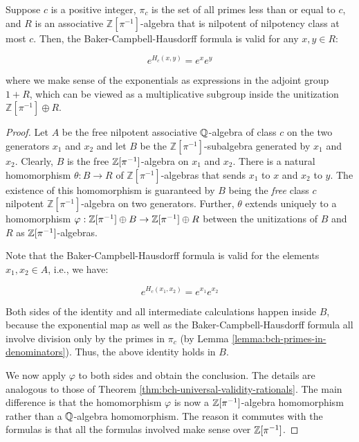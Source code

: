\begin{theorem}\label{thm:bch-universal-validity-pi-powered}
  Suppose $c$ is a positive integer, $\pi_c$ is the set of all primes
  less than or equal to $c$, and $R$ is an associative
  $\mathbb{Z}[\pi^{-1}]$-algebra that is nilpotent of nilpotency class
  at most $c$. Then, the Baker-Campbell-Hausdorff formula is valid
  for any $x,y \in R$:
    
  $$e^{H_c(x,y)} = e^xe^y$$
    
  where we make sense of the exponentials as expressions in the
  adjoint group $1 + R$, which can be viewed as a multiplicative
  subgroup inside the unitization $\mathbb{Z}[\pi^{-1}] \oplus R$.
\end{theorem}

\begin{proof}
  Let $A$ be the free nilpotent associative $\mathbb{Q}$-algebra of class $c$
  on the two generators $x_1$ and $x_2$ and let $B$ be the
  $\mathbb{Z}[\pi^{-1}]$-subalgebra generated by $x_1$ and
  $x_2$. Clearly, $B$ is the free $\mathbb{Z}[\pi^{-1}]$-algebra on $x_1$ and
  $x_2$. There is a natural homomorphism $\theta: B \to R$ of
  $\mathbb{Z}[\pi^{-1}]$-algebras that sends $x_1$ to $x$ and $x_2$ to
  $y$. The existence of this homomorphism is guaranteed by $B$ being
  the {\em free} class $c$ nilpotent $\mathbb{Z}[\pi^{-1}]$-algebra on
  two generators. Further, $\theta$ extends uniquely to a homomorphism
  $\varphi: \mathbb{Z}[\pi^{-1}] \oplus B \to \mathbb{Z}[\pi^{-1}] \oplus R$ between
  the unitizations of $B$ and $R$ as $\mathbb{Z}[\pi^{-1}]$-algebras.

  Note that the Baker-Campbell-Hausdorff formula is valid for the
  elements $x_1,x_2 \in A$, i.e., we have:

  $$e^{H_c(x_1,x_2)} = e^{x_1}e^{x_2}$$

  Both sides of the identity and all intermediate calculations happen
  inside $B$, because the exponential map as well as the
  Baker-Campbell-Hausdorff formula all involve division only by the
  primes in $\pi_c$ (by Lemma
  \ref{lemma:bch-primes-in-denominators}). Thus, the above identity
  holds in $B$.

  We now apply $\varphi$ to both sides and obtain the conclusion. The
  details are analogous to those of Theorem
  \ref{thm:bch-universal-validity-rationals}. The main difference is
  that the homomorphism $\varphi$ is now a $\mathbb{Z}[\pi^{-1}]$-algebra
  homomorphism rather than a $\mathbb{Q}$-algebra homomorphism. The reason it
  commutes with the formulas is that all the formulas involved make
  sense over $\mathbb{Z}[\pi^{-1}]$.
\end{proof}

